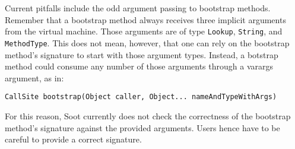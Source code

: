 \documentclass{article}
\begin{document}
Current pitfalls include the odd argument passing to bootstrap methods. Remember
that a bootstrap method always receives three implicit arguments from the
virtual machine. Those arguments are of type \texttt{Lookup}, \texttt{String},
and \texttt{MethodType}. This does not mean, however, that one can rely on the
bootstrap method's signature to start with those argument types. Instead, a
botstrap method could consume any number of those arguments through a varargs
argument, as in:
\begin{verbatim}
CallSite bootstrap(Object caller, Object... nameAndTypeWithArgs)
\end{verbatim}
For this reason, Soot currently does not check the correctness of the bootstrap
method's signature against the provided arguments. Users hence have to be
careful to provide a correct signature.
\end{document}
